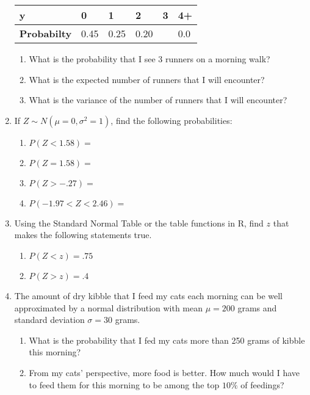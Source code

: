 \documentclass[]{book}
\providecommand{\tightlist}{%
  \setlength{\itemsep}{0pt}\setlength{\parskip}{0pt}}
\begin{document}
\begin{enumerate}
  \begin{longtable}[]{@{}llllll@{}}
  \toprule
  y & 0 & 1 & 2 & 3 & 4+\tabularnewline
  \midrule
  \endhead
  \textbf{Probabilty} & 0.45 & 0.25 & 0.20 & & 0.0\tabularnewline
  \bottomrule
  \end{longtable}

  \begin{enumerate}
  \def\labelenumii{\alph{enumii})}
  \tightlist
  \item
    What is the probability that I see 3 runners on a morning walk?
  \item
    What is the expected number of runners that I will encounter?
  \item
    What is the variance of the number of runners that I will encounter?
  \end{enumerate}
\item
  If \(Z\sim N\left(\mu=0,\sigma^{2}=1\right)\), find the following
  probabilities:

  \begin{enumerate}
  \def\labelenumii{\alph{enumii})}
  \tightlist
  \item
    \(P(Z<1.58)=\)
  \item
    \(P(Z=1.58)=\)
  \item
    \(P(Z>-.27)=\)
  \item
    \(P(-1.97<Z<2.46)=\)
  \end{enumerate}
\item
  Using the Standard Normal Table or the table functions in R, find
  \(z\) that makes the following statements true.

  \begin{enumerate}
  \def\labelenumii{\alph{enumii})}
  \tightlist
  \item
    \(P(Z<z)=.75\)
  \item
    \(P(Z>z)=.4\)
  \end{enumerate}
\item
  The amount of dry kibble that I feed my cats each morning can be well
  approximated by a normal distribution with mean \(\mu=200\) grams and
  standard deviation \(\sigma=30\) grams.

  \begin{enumerate}
  \def\labelenumii{\alph{enumii})}
  \tightlist
  \item
    What is the probability that I fed my cats more than 250 grams of
    kibble this morning?
  \item
    From my cats' perspective, more food is better. How much would I
    have to feed them for this morning to be among the top \(10\%\) of
    feedings?
  \end{enumerate}
\end{enumerate}


\end{document}
